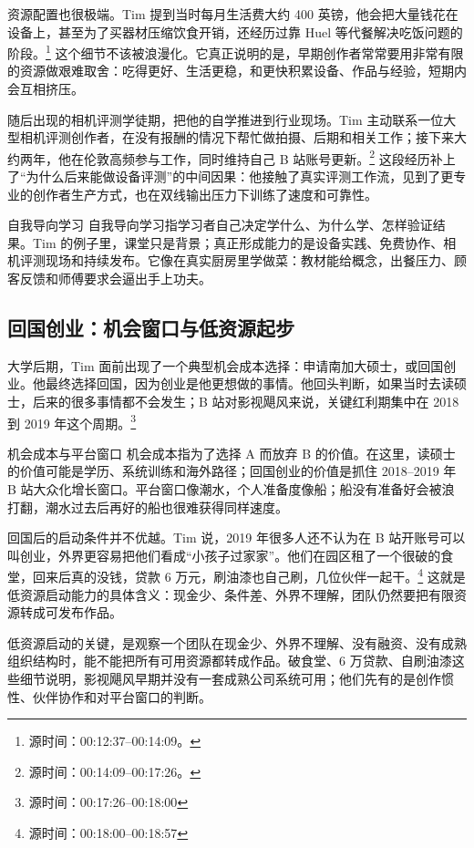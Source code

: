 \documentclass[a4paper]{article}
\begin{document}
资源配置也很极端。Tim 提到当时每月生活费大约 400 英镑，他会把大量钱花在设备上，甚至为了买器材压缩饮食开销，还经历过靠 Huel 等代餐解决吃饭问题的阶段。\footnote{源时间：00:12:37--00:14:09。} 这个细节不该被浪漫化。它真正说明的是，早期创作者常常要用非常有限的资源做艰难取舍：吃得更好、生活更稳，和更快积累设备、作品与经验，短期内会互相挤压。

随后出现的相机评测学徒期，把他的自学推进到行业现场。Tim 主动联系一位大型相机评测创作者，在没有报酬的情况下帮忙做拍摄、后期和相关工作；接下来大约两年，他在伦敦高频参与工作，同时维持自己 B 站账号更新。\footnote{源时间：00:14:09--00:17:26。} 这段经历补上了“为什么后来能做设备评测”的中间因果：他接触了真实评测工作流，见到了更专业的创作者生产方式，也在双线输出压力下训练了速度和可靠性。

\begin{knowledgebox}{自我导向学习}
自我导向学习指学习者自己决定学什么、为什么学、怎样验证结果。Tim 的例子里，课堂只是背景；真正形成能力的是设备实践、免费协作、相机评测现场和持续发布。它像在真实厨房里学做菜：教材能给概念，出餐压力、顾客反馈和师傅要求会逼出手上功夫。
\end{knowledgebox}

\subsection{回国创业：机会窗口与低资源起步}

大学后期，Tim 面前出现了一个典型机会成本选择：申请南加大硕士，或回国创业。他最终选择回国，因为创业是他更想做的事情。他回头判断，如果当时去读硕士，后来的很多事情都不会发生；B 站对影视飓风来说，关键红利期集中在 2018 到 2019 年这个周期。\footnote{源时间：00:17:26--00:18:00}

\begin{knowledgebox}{机会成本与平台窗口}
机会成本指为了选择 A 而放弃 B 的价值。在这里，读硕士的价值可能是学历、系统训练和海外路径；回国创业的价值是抓住 2018--2019 年 B 站大众化增长窗口。平台窗口像潮水，个人准备度像船；船没有准备好会被浪打翻，潮水过去后再好的船也很难获得同样速度。
\end{knowledgebox}

回国后的启动条件并不优越。Tim 说，2019 年很多人还不认为在 B 站开账号可以叫创业，外界更容易把他们看成“小孩子过家家”。他们在园区租了一个很破的食堂，回来后真的没钱，贷款 6 万元，刷油漆也自己刷，几位伙伴一起干。\footnote{源时间：00:18:00--00:18:57} 这就是低资源启动能力的具体含义：现金少、条件差、外界不理解，团队仍然要把有限资源转成可发布作品。

低资源启动的关键，是观察一个团队在现金少、外界不理解、没有融资、没有成熟组织结构时，能不能把所有可用资源都转成作品。破食堂、6 万贷款、自刷油漆这些细节说明，影视飓风早期并没有一套成熟公司系统可用；他们先有的是创作惯性、伙伴协作和对平台窗口的判断。
\end{document}
